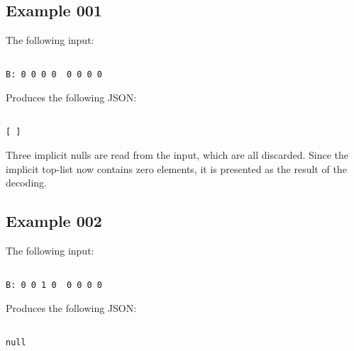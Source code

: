 \subsection{Example 001}

The following input:

\begin{changemargin}{-60mm}{0mm}
\begin{myquote}
\begin{verbatim}

B: 0 0 0 0  0 0 0 0

\end{verbatim}
\end{myquote}
\end{changemargin}

Produces the following JSON:

\begin{changemargin}{-60mm}{0mm}
\begin{myquote}
\begin{verbatim}

[ ]

\end{verbatim}
\end{myquote}
\end{changemargin}

Three implicit nulls are read from the input, which are all discarded.
Since the implicit top-list now contains zero elements, it is presented
as the result of the decoding.

\subsection{Example 002}

The following input:

\begin{changemargin}{-60mm}{0mm}
\begin{myquote}
\begin{verbatim}

B: 0 0 1 0  0 0 0 0

\end{verbatim}
\end{myquote}
\end{changemargin}

Produces the following JSON:

\begin{changemargin}{-60mm}{0mm}
\begin{myquote}
\begin{verbatim}

null

\end{verbatim}
\end{myquote}
\end{changemargin}

